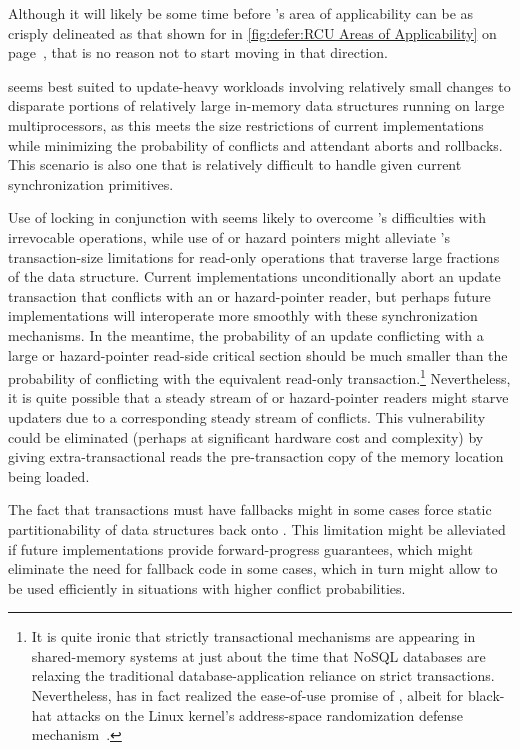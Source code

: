 Although it will likely be some time before 's area of applicability
can be as crisply delineated as that shown for  in
\cref{fig:defer:RCU Areas of Applicability} on
page~\pageref{fig:defer:RCU Areas of Applicability}, that is no reason not to
start moving in that direction.

 seems best suited to update-heavy workloads involving relatively
small changes to disparate portions of relatively large in-memory
data structures running on large multiprocessors,
as this meets the size restrictions of current  implementations while
minimizing the probability of conflicts and attendant aborts and
rollbacks.
This scenario is also one that is relatively difficult to handle given
current synchronization primitives.

Use of locking in conjunction with  seems likely to overcome 's
difficulties with irrevocable operations, while use of  or
hazard pointers might alleviate 's transaction-size limitations
for read-only operations that traverse large fractions of the data
structure.
Current  implementations unconditionally abort an update transaction
that conflicts with an  or hazard-pointer reader, but perhaps future
 implementations will interoperate more smoothly with these
synchronization mechanisms.
In the meantime, the probability of an update conflicting with a
large  or hazard-pointer read-side critical section should be
much smaller than the probability of conflicting with the equivalent
read-only transaction.\footnote{
	It is quite ironic that strictly transactional mechanisms are
	appearing in shared-memory systems at just about the time
	that NoSQL databases are relaxing the traditional
	database-application reliance on strict transactions.
	Nevertheless,  has in fact realized the ease-of-use promise
	of , albeit for black-hat attacks on the Linux kernel's
	address-space randomization defense
	mechanism~\cite{YeongjinJang2016TSXbreakKASLR,Jang:2016:BKA:2976749.2978321}.}
Nevertheless, it is quite possible that a steady stream of  or
hazard-pointer readers might starve updaters due to a corresponding
steady stream of conflicts.
This vulnerability could be eliminated (perhaps at significant
hardware cost and complexity) by giving extra-transactional
reads the pre-transaction copy of the memory location being loaded.

The fact that  transactions must have fallbacks might in some cases
force static partitionability of data structures back onto .
This limitation might be alleviated if future  implementations
provide forward-progress guarantees, which might eliminate the need
for fallback code in some cases, which in turn might allow  to
be used efficiently in situations with higher conflict probabilities.


